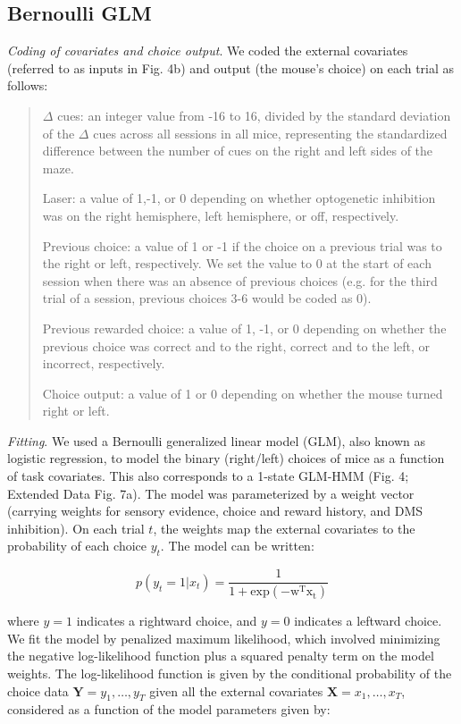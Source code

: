 \subsection{Bernoulli GLM}
\label{sec:ap1:m9}
\textit{Coding of covariates and choice output}. We coded the external covariates (referred to as inputs in Fig. 4b) and output (the mouse’s choice) on each trial as follows: 
\begin{quote}
$\Delta$ cues: an integer value from -16 to 16, divided by the standard deviation of the $\Delta$ cues across all sessions in all mice, representing the standardized difference between the number of cues on the right and left sides of the maze. 

Laser: a value of 1,-1, or 0 depending on whether optogenetic inhibition was on the right hemisphere, left hemisphere, or off, respectively. 

Previous choice: a value of 1 or  -1 if the choice on a previous trial was to the right or left, respectively. We set the value to 0 at the start of each session when there was an absence of previous choices (e.g. for the third trial of a session, previous choices 3-6 would be coded as 0). 

Previous rewarded choice: a value of 1, -1, or 0 depending on whether the previous choice was correct and to the right, correct and to the left, or incorrect, respectively. 

Choice output: a value of 1 or 0 depending on whether the mouse turned right or left.
\end{quote} 
\textit{Fitting}. We used a Bernoulli generalized linear model (GLM), also known as logistic regression, to model the  binary (right/left) choices of mice as a function of task covariates. This also corresponds to a 1-state GLM-HMM (Fig. 4; Extended Data Fig. 7a). The model was parameterized by a weight vector (carrying weights for sensory evidence, choice and reward history, and DMS inhibition). On each trial $t$, the weights map the external covariates to the probability of each choice $y_t$. The model can be written: 

\begin{equation}
\label{eq:m4}
    p\left( {y_t = 1\left| {x_t} \right.} \right) = \frac{1}{{1 + {{{\mathrm{exp}}}}\left( { - {{{\mathrm{w}}}}^{{{\mathrm{T}}}}{{{\mathrm{x}}}}_{{{\mathrm{t}}}}} \right)}}
\end{equation}

where $y=1$ indicates a rightward choice, and $y=0$ indicates a leftward choice. We fit the model by penalized maximum likelihood, which involved minimizing the negative log-likelihood function plus a squared penalty term on the model weights. The log-likelihood function is given by the conditional probability of the choice data ${{{\mathbf{Y}}}} = y_1, \ldots ,y_T$ given all the external covariates ${{{\mathbf{X}}}} = x_1, \ldots ,x_T$, considered as a function of the model parameters given by: 

